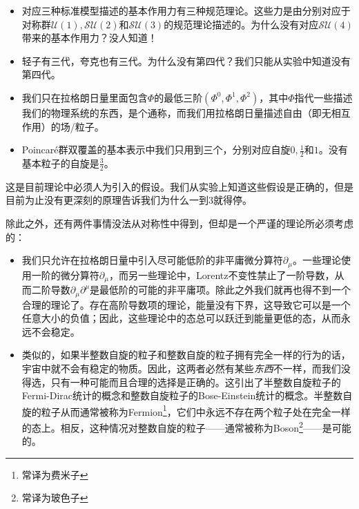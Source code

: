 \begin{itemize}
\item 对应三种标准模型描述的基本作用力有三种规范理论。这些力是由分别对应于对称群$\mathcal{U}(1), \mathcal{SU}(2)$和$\mathcal{SU}(3)$的规范理论描述的。为什么没有对应$\mathcal{SU}(4)$带来的基本作用力？没人知道！
\item 轻子有三代，夸克也有三代。为什么没有第四代？我们只能从实验中知道没有第四代。
\item 我们只在拉格朗日量里面包含$\Phi$的最低三阶$(\Phi^0, \Phi^1, \Phi^2)$，其中$\Phi$指代一些描述我们的物理系统的东西，是个通称，而我们用拉格朗日量描述自由（即无相互作用）的场/粒子。
\item Poincaré群双覆盖的基本表示中我们只用到三个，分别对应自旋$0, \tfrac{1}{2}$和$1$。没有基本粒子的自旋是$\tfrac{3}{2}$。
\end{itemize}

这是目前理论中必须人为引入的假设。我们从实验上知道这些假设是正确的，但是目前为止没有更深刻的原理告诉我们为什么一到$3$就得停。

除此之外，还有两件事情没法从对称性中得到，但却是一个严谨的理论所必须考虑的：

\begin{itemize}
\item 我们只允许在拉格朗日量中引入尽可能低阶的非平庸微分算符$\partial_\mu$。一些理论使用一阶的微分算符$\partial_\mu$，而另一些理论中，Lorentz不变性禁止了一阶导数，从而二阶导数$\partial_\mu\partial^\mu$是最低阶的可能的非平庸项。除此之外我们就再也得不到一个合理的理论了。存在高阶导数项的理论，能量没有下界，这导致它可以是一个任意大小的负值；因此，这些理论中的态总可以跃迁到能量更低的态，从而永远不会稳定。
\item 类似的，如果半整数自旋的粒子和整数自旋的粒子拥有完全一样的行为的话，宇宙中就不会有稳定的物质。因此，这两者必然有某些{\it 东西}不一样，而我们没得选，只有一种可能而且合理的选择是正确的。这引出了半整数自旋粒子的Fermi-Dirac统计的概念和整数自旋粒子的Bose-Einstein统计的概念。半整数自旋的粒子从而通常被称为Fermion\footnote{常译为费米子}，它们中永远不存在两个粒子处在完全一样的态上。相反，这种情况对整数自旋的粒子——通常被称为Boson\footnote{常译为玻色子}——是可能的。
\end{itemize}

